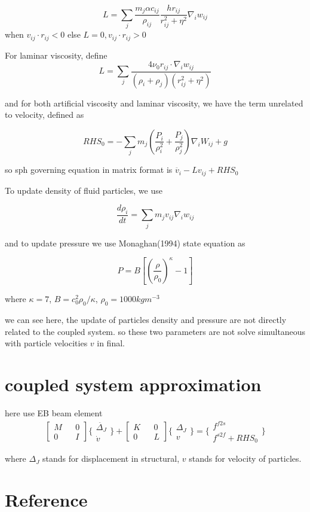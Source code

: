 \documentclass[11pt]{article}
\begin{document}
$$ L = \sum_j \frac{m_j \alpha c_{ij}}{\rho _ {ij}} \frac{h r_{ij}}{r_{ij}^2 + \eta^2} \nabla_i w_{ij}$$ when $ v_{ij} \cdot r_{ij} < 0 $ else $ L =0 ,  v_{ij} \cdot r_{ij} > 0$

For laminar viscosity, define
$$ L = \sum_{j} \frac{4 \nu_0 r_{ij} \cdot \nabla_i w_{ij}}{(\rho_i + \rho_j)(r_{ij}^2+\eta^2)} $$ 

and for both artificial viscosity and laminar viscosity, we have the term unrelated to velocity, defined as

$$ RHS_0 =  - \sum_{j} m_j (\frac{P_i}{\rho _i ^2} + \frac{P_j}{\rho_j ^2}) \nabla_i W_{ij} + g $$

so sph governing equation in matrix format is 
$ \ddot{v_i} - L v_{ij} + RHS_0 $

To update density of fluid particles, we use 

$$ \frac{d \rho_i}{dt} = \sum_j m_j v_{ij} \nabla_i w_{ij} $$

and to update pressure we use Monaghan(1994) state equation as

$$ P = B[ (\frac{\rho}{\rho_0})^ \kappa - 1] $$

where $\kappa = 7$, $B= c_0^2 \rho_0 /\kappa$, $\rho_0 = 1000 kgm^{-3}$ 

we can see here, the update of particles density and pressure are not directly related to the coupled system. so these two parameters are not solve simultaneous with particle velocities $v$ in final.

\section{coupled system approximation}

here use EB beam element
 $$ \begin{bmatrix} M && 0 \\ 0 && I \end{bmatrix} \{ \begin{array}{c} \ddot{\Delta_J} \\ \dot{v} \end{array} \} + \begin{bmatrix} K && 0 \\ 0 && L \end{bmatrix} \{ \begin{array}{c} \Delta_J \\ v \end{array} \} = \{ \begin{array}{c} f^{f2s}\\ f^{s2f}+RHS_0 \end{array} \} $$

where $ \Delta_J$ stands for displacement in structural, $v$ stands for velocity of particles. 

\section{Reference}
% 
\end{document}

